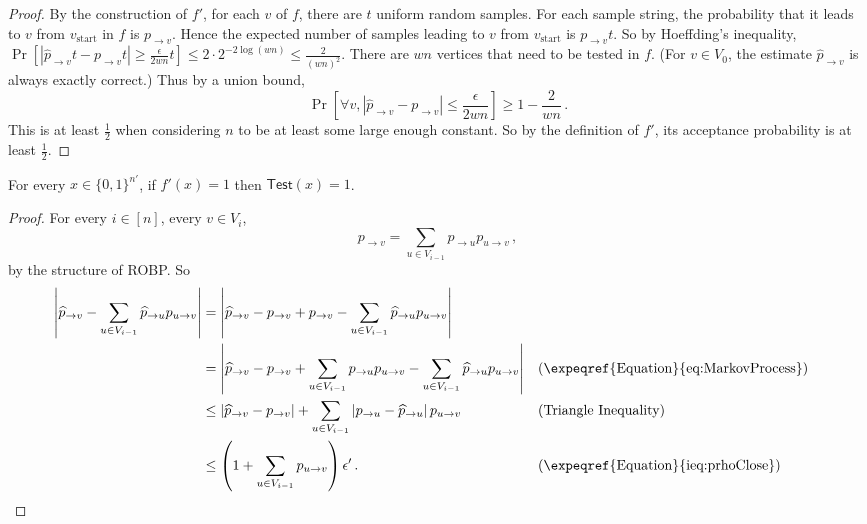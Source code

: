 \begin{proof}
By the construction of $f'$, for each $v$ of $f$, there are $t$ uniform random samples. For each sample string, the probability that it leads to $v$ from $v_{\text{start}}$ in $f$ is $ p_{\to v} $. Hence the expected number of samples leading to $v$ from $v_{\text{start}}$ is $  p_{\to v}  t $. So by Hoeffding's inequality, $\Pr[|\widehat{p}_{\to v}t - p_{\to v} t| \geq \frac{\epsilon}{2wn} t ] \leq 2 \cdot 2^{-2 \log(wn)}\leq \frac{2}{(wn)^2}$. There are $w n $ vertices that need to be tested in $f$. (For $v \in V_0$, the estimate $\widehat{p}_{\to v}$ is always exactly correct.) Thus by a union bound, 
\[ \Pr\left[ \forall v, \left| \widehat{p}_{\to v}  -  p_{\to v} \right| \leq  \frac{\epsilon}{2wn} \right] \geq 1 - \frac{2}{ wn }\,. \]
This is at least $\frac{1}{2}$ when considering $n$ to be at least some large enough constant. So by the definition of $f'$, its acceptance probability is at least $\frac{1}{2}$.
\end{proof}

\begin{lemma} \label{lem:somexPassTest}
For every $x \in \{0, 1\}^{n'}$, if $ f'(x) = 1 $ then $\mathsf{Test}(x) = 1$.
\end{lemma}

\begin{proof}
For every $i\in [n]$, every $v\in V_{i}$,  
\begin{equation} \label{eq:MarkovProcess}
p_{\to v}  = \sum_{u\in V_{i-1}}  p_{\to u} p_{u \to v}\,,
\end{equation}
by the structure of ROBP. So
\begin{align*}
\left| \widehat{p}_{\to v} -  \sum_{u\in V_{i-1}}  \widehat{p}_{\to u} p_{u \to v} \right|
&= \left| \widehat{p}_{\to v} - p_{\to v} + p_{\to v}  -   \sum_{u\in V_{i-1}} \widehat{p}_{\to u} p_{u \to v}   \right| \\
&=\left| \widehat{p}_{\to v} - p_{\to v} + \sum_{u\in V_{i-1}} p_{\to u} p_{u\to v} - \sum_{u\in V_{i-1}}  \widehat{p}_{\to u} p_{u \to v} \right|
&& (\text{\expeqref{Equation}{eq:MarkovProcess}}) \\
&\leq \left| \widehat{p}_{\to v} - p_{\to v} \right| +    \sum_{u \in V_{i-1} } \left| p_{\to u}-\widehat{p}_{\to u} \right| p_{u \to v}   
&& (\text{Triangle Inequality}) \\
&\leq \left( 1 + \sum_{u\in V_{i-1}}p_{u\to v} \right) \epsilon'\,. 
&& (\text{\expeqref{Equation}{ieq:prhoClose}}) \qedhere
\end{align*}
\end{proof}

